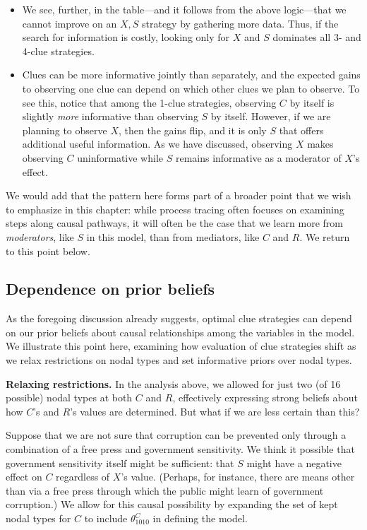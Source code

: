 \documentclass[
  12pt,
]{book}
\begin{document}
\begin{itemize}
\item
  We see, further, in the table---and it follows from the above logic---that we cannot improve on an \(X, S\) strategy by gathering more data. Thus, if the search for information is costly, looking only for \(X\) and \(S\) dominates all 3- and 4-clue strategies.
\item
  Clues can be more informative jointly than separately, and the expected gains to observing one clue can depend on which other clues we plan to observe. To see this, notice that among the 1-clue strategies, observing \(C\) by itself is slightly \emph{more} informative than observing \(S\) by itself. However, if we are planning to observe \(X\), then the gains flip, and it is only \(S\) that offers additional useful information. As we have discussed, observing \(X\) makes observing \(C\) uninformative while \(S\) remains informative as a moderator of \(X\)'s effect.
\end{itemize}

We would add that the pattern here forms part of a broader point that we wish to emphasize in this chapter: while process tracing often focuses on examining steps along causal pathways, it will often be the case that we learn more from \emph{moderators}, like \(S\) in this model, than from mediators, like \(C\) and \(R\). We return to this point below.

\hypertarget{dependence-on-prior-beliefs}{%
\subsection{Dependence on prior beliefs}\label{dependence-on-prior-beliefs}}

As the foregoing discussion already suggests, optimal clue strategies can depend on our prior beliefs about causal relationships among the variables in the model. We illustrate this point here, examining how evaluation of clue strategies shift as we relax restrictions on nodal types and set informative priors over nodal types.

\textbf{Relaxing restrictions.} In the analysis above, we allowed for just two (of 16 possible) nodal types at both \(C\) and \(R\), effectively expressing strong beliefs about how \(C\)'s and \(R\)'s values are determined. But what if we are less certain than this?

Suppose that we are not sure that corruption can be prevented only through a combination of a free press and government sensitivity. We think it possible that government sensitivity itself might be sufficient: that \(S\) might have a negative effect on \(C\) regardless of \(X\)'s value. (Perhaps, for instance, there are means other than via a free press through which the public might learn of government corruption.) We allow for this causal possibility by expanding the set of kept nodal types for \(C\) to include \(\theta^C_{1010}\) in defining the model.
\end{document}
